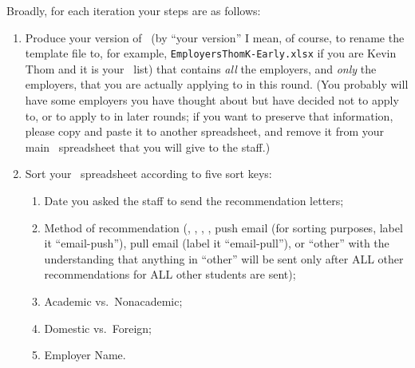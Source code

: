 \documentclass{econtex}
\begin{document}
Broadly, for each iteration your steps are as follows:
\begin{enumerate}
\begin{comment}
\item Create a manila folder with your name nicely written at the top
  (last name, first name, and moniker) in which the staff will keep all your
  records during the job market process.  (Ask the staff to give
  you the folder; they will probably want them all to be the same
  size/style).

\item Produce a list of your recommenders' names (3 or 4, usually) ON
  PAPER which you will give to the staff so that they can tick off
  recommenders' names as the recommenders' letters are received.
  (This checklist will be the first item that goes in your manila folder.)
\end{comment}

\item Produce your version of \EM~(by ``your version'' I mean, of
  course, to rename the template file to, for example,
  \texttt{EmployersThomK-Early.xlsx} if you are Kevin Thom and it is
  your \Early~list) that contains {\it all} the employers, and {\it
    only} the employers, that you are actually applying to in this
  round.  (You probably will have some employers you have thought
  about but have decided not to apply to, or to apply to in later rounds; if you want to preserve that
  information, please copy and paste it to another spreadsheet, and
  remove it from your main \EMW~spreadsheet that you will give to the
  staff.)

\item Sort your \EM~spreadsheet according to five sort keys:
 \begin{enumerate} 
 \item Date you asked the staff to send the recommendation letters; 
 \item Method of recommendation (\AEA, \AJO, \EJM, \Interfolio, push email (for sorting purposes,
  label it ``email-push''), pull email (label it ``email-pull''), or
  ``other'' with the understanding that anything in ``other'' will be
  sent only after ALL other recommendations for ALL other students are
  sent);
  \item Academic vs.\ Nonacademic;
  \item Domestic vs.\ Foreign;
  \item Employer Name. 
  \end{enumerate} 


\end{enumerate}
\end{document}
